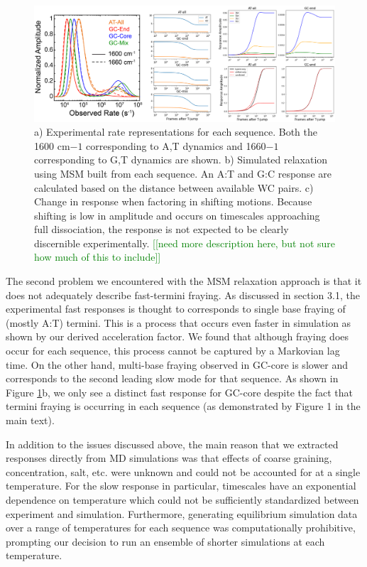 \documentclass[11pt,a4paper]{letter} %
\newcommand*{\noteg}[1]{\textcolor{green}{[[#1]]}}		%
\begin{document}
\begin{figure}[ht!]
	\begin{center}
        \includegraphics[width=120mm]{cover_letter/revision_figures/responses_all.png}
        \caption{a) Experimental rate representations for each sequence. Both the 1600 cm$-1$ corresponding to A,T dynamics and 1660$-1$ corresponding to G,T dynamics are shown. b) Simulated relaxation using MSM built from each sequence. An A:T and G:C response are calculated based on the distance between available WC pairs. c) Change in response when factoring in shifting motions. Because shifting is low in amplitude and occurs on timescales approaching full dissociation, the response is not expected to be clearly discernible experimentally.  \noteg{need more description here, but not sure how much of this to include} }
        \label{fig:responses_all}
	\end{center}
\end{figure}

The second problem we encountered with the MSM relaxation approach is that it does not adequately describe fast-termini fraying. As discussed in section 3.1, the experimental fast responses is thought to corresponds to single base fraying of (mostly A:T) termini. This is a process that occurs even faster in simulation as shown by our derived acceleration factor. We found that although fraying does occur for each sequence, this process cannot be captured by a Markovian lag time. On the other hand, multi-base fraying observed in GC-core is slower and corresponds to the second leading slow mode for that sequence. As shown in Figure \ref{fig:responses_all}b, we only see a distinct fast response for GC-core despite the fact that termini fraying is occurring in each sequence (as demonstrated by Figure 1 in the main text). 

In addition to the issues discussed above, the main reason that we extracted responses directly from MD simulations was that effects of coarse graining, concentration, salt, etc. were unknown and could not be accounted for at a single temperature. For the slow response in particular,  timescales have an exponential dependence on temperature which could not be sufficiently standardized between experiment and simulation. Furthermore, generating equilibrium simulation data over a range of temperatures for each sequence was computationally prohibitive, prompting our decision to run an ensemble of shorter simulations at each temperature.
\end{document}
